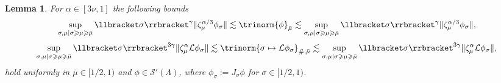 \documentclass{article}
\numberwithin{equation}{section}
\newcommand{\assign}{:=}
\theoremstyle{plain}
\newtheorem{lemma}[theorem]{Lemma}
\theoremstyle{definition}
\begin{document}
\begin{lemma}
  \label{lem:triple-phi}For $\alpha \in [3 \nu, 1]$ the following bounds
  \begin{equation}
    \sup_{\sigma, \mu | \sigma \geqslant \mu \geqslant \bar{\mu}} \llbracket
    \sigma \rrbracket^{\gamma}  \| \zeta_{\mu}^{\alpha / 3} \phi_{\sigma} \|
    \lesssim \trinorm{ \phi }_{\bar{\mu}} \lesssim \sup_{\sigma,
    \mu | \sigma \geqslant \mu \geqslant \bar{\mu}} \llbracket \sigma
    \rrbracket^{\gamma}  \| \zeta_{\mu}^{\alpha / 3} \phi_{\sigma} \|,
    \label{eq:equiv-norms}
  \end{equation}
  \begin{equation}
    \sup_{\sigma, \mu | \sigma \geqslant \mu \geqslant \bar{\mu}} \llbracket
    \sigma \rrbracket^{3 \gamma}  \| \zeta_{\mu}^{\alpha} \mathcal{L}
    \phi_{\sigma} \| \lesssim \trinorm{ \sigma \mapsto \mathcal{L}
    \phi_{\sigma} }_{\#, \bar{\mu}} \lesssim \sup_{\sigma, \mu
    | \sigma \geqslant \mu \geqslant \bar{\mu}} \llbracket \sigma
    \rrbracket^{3 \gamma}  \| \zeta^{\alpha}_{\mu} \mathcal{L} \phi_{\sigma}
    \|, \label{eq:equiv-norms-L}
  \end{equation}
  hold uniformly in $\bar{\mu} \in [1 / 2, 1)$ and $\phi \in \mathcal{S}'
  (\Lambda)$, where $\phi_{\sigma} \assign J_{\sigma} \phi$ for $\sigma \in [1
  / 2, 1)$.
\end{lemma}
\end{document}

